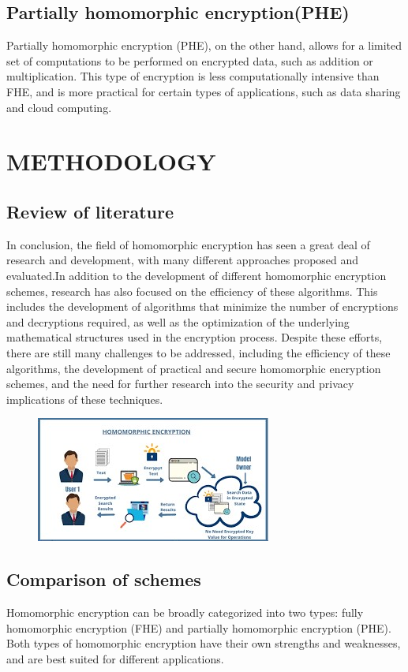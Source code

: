 \documentclass[a4paper,11pt]{report}
\begin{document}
\section{Partially homomorphic encryption(PHE)}\label{AA}
Partially homomorphic encryption (PHE), on the other hand, allows for a limited set of computations to be performed on encrypted data, such as addition or multiplication. This type of encryption is less computationally intensive than FHE, and is more practical for certain types of applications, such as data sharing and cloud computing.
  
\chapter{METHODOLOGY}

\section{Review of literature}
In conclusion, the field of homomorphic encryption has seen a great deal of research and development, with many different approaches proposed and evaluated.In addition to the development of different homomorphic encryption schemes, research has also focused on the efficiency of these algorithms. This includes the development of algorithms that minimize the number of encryptions and decryptions required, as well as the optimization of the underlying mathematical structures used in the encryption process. Despite these efforts, there are still many challenges to be addressed, including the efficiency of these algorithms, the development of practical and secure homomorphic encryption schemes, and the need for further research into the security and privacy implications of these techniques.
\begin{figure}[h]
	\centering
	\hspace{21pt}
	\includegraphics[width=.70\linewidth]{he.jpg}
	\label{fig:he.jpg}
\end{figure}
\section{Comparison of schemes}
Homomorphic encryption can be broadly categorized into two types: fully homomorphic encryption (FHE) and partially homomorphic encryption (PHE). Both types of homomorphic encryption have their own strengths and weaknesses, and are best suited for different applications.
\end{document}
